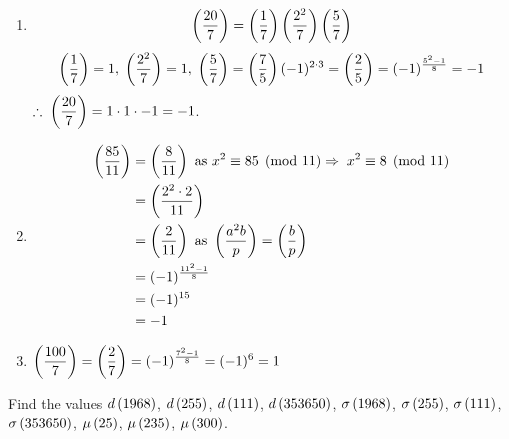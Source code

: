 \documentclass[12pt]{book}
\begin{document}
\begin{soln}
\begin{enumerate}
        \item \[\left( \frac{20}{7} \right)=\left( \frac{1}{7} \right)\left( \frac{2^2}{7} \right)\left( \frac{5}{7} \right) \]
        \[\left( \frac{1}{7} \right)=1,\;\left( \frac{2^2}{7} \right)=1,\;\left( \frac{5}{7} \right)=\left( \frac{7}{5} \right)(-1)^{2\cdot 3 }=\left( \frac{2}{5} \right)=(-1)^{\frac{5^2-1}{8}}=-1\]
        $ \displaystyle \therefore\; \left( \frac{20}{7} \right)=1\cdot1\cdot-1=-1 $.
        \item \begin{align*}
            \left( \frac{85}{11} \right)&=\left( \frac{8}{11} \right) \text{ as } x^2\equiv 85 \pmod{11} \Rightarrow\; x^2\equiv 8 \pmod{11}\\
            &=\left( \frac{2^2\cdot 2}{11} \right)\\
            &=\left( \frac{2}{11} \right)\text{ as }\left( \frac{a^2b}{p} \right)=\left( \frac{b}{p} \right)\\
            &=(-1)^{\frac{11^2-1}{8}}\\
            &=(-1)^{15}\\
            &=-1
        \end{align*}
        \item $ \displaystyle \left( \frac{100}{7} \right)=\left( \frac{2}{7} \right)=(-1)^{\frac{7^2-1}{8}}=(-1)^6=1 $
    \end{enumerate}
\end{soln}
\begin{qn}
    Find the values $ d\left( 1968 \right) $, $ d\left( 255 \right) $, $ d\left( 111 \right) $, $ d\left( 353650 \right) $, $ \sigma\left( 1968 \right) $, $ \sigma\left( 255 \right) $, $ \sigma\left( 111 \right) $, $ \sigma\left( 353650 \right) $, $ \mu\left( 25 \right) $, $ \mu\left( 235 \right) $, $ \mu\left( 300 \right) $.
\end{qn}
\end{document}
